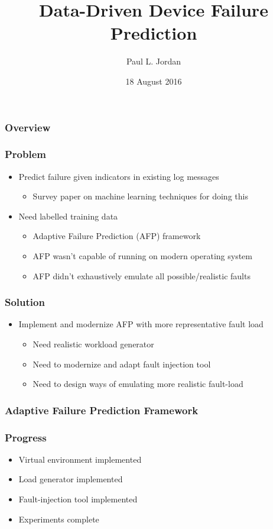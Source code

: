 \documentclass[aspectratio=169]{beamer}
\title{Data-Driven Device Failure Prediction}
\author{Paul L. Jordan}
\institute{Air Force Institute of Technology \\
Center for Cyberspace Research}
\date{18 August 2016}
\begin{document}
\frame{\titlepage}

\begin{frame}
  \frametitle{Overview}
  \tableofcontents
\end{frame}
 

\begin{frame}
  \frametitle{Problem}
  \begin{itemize}
  \item{Predict failure given indicators in existing log messages}
    \begin{itemize}
    \item{Survey paper on machine learning techniques for doing
    this~\cite{salfnerSurvey}}
    \end{itemize}
  \item{Need labelled training data}
    \begin{itemize}
    \item{Adaptive Failure Prediction (AFP) framework~\cite{irrera2015}}
    \item{AFP wasn't capable of running on modern operating system}
    \item{AFP didn't exhaustively emulate all possible/realistic
    faults~\cite{kikuchi2014}}
    \end{itemize}
  \end{itemize}
\end{frame}


\begin{frame}
  \frametitle{Solution}
  \begin{itemize}
  \item{Implement and modernize AFP with more representative fault load}
    \begin{itemize}
    \item{Need realistic workload generator}
    \item{Need to modernize and adapt fault injection tool}
    \item{Need to design ways of emulating more realistic fault-load}
    \end{itemize}
  \end{itemize}
\end{frame}


\begin{frame}
  \frametitle{Adaptive Failure Prediction Framework}
\end{frame}


\begin{frame}
  \frametitle{Progress}
  \begin{itemize}
  \item{\textcolor{green}{\checkmark} Virtual environment implemented}
  \item{\textcolor{green}{\checkmark} Load generator implemented}
  \item{\textcolor{green}{\checkmark} Fault-injection tool implemented}
  \item{\textcolor{green}{\checkmark} Experiments complete}
  \end{itemize}
\end{frame}
\end{document}
